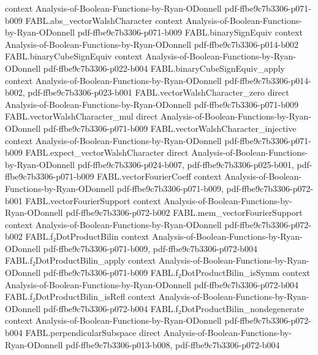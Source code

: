 \begin{theorem}
  {context}
  {Analysis-of-Boolean-Functions-by-Ryan-ODonnell}
  {pdf-ffbe9c7b3306-p071-b009}
\proofstep
  {FABL.abs_vectorWalshCharacter}
  {context}
  {Analysis-of-Boolean-Functions-by-Ryan-ODonnell}
  {pdf-ffbe9c7b3306-p071-b009}
\proofstep
  {FABL.binarySignEquiv}
  {context}
  {Analysis-of-Boolean-Functions-by-Ryan-ODonnell}
  {pdf-ffbe9c7b3306-p014-b002}
\proofstep
  {FABL.binaryCubeSignEquiv}
  {context}
  {Analysis-of-Boolean-Functions-by-Ryan-ODonnell}
  {pdf-ffbe9c7b3306-p022-b004}
\proofstep
  {FABL.binaryCubeSignEquiv_apply}
  {context}
  {Analysis-of-Boolean-Functions-by-Ryan-ODonnell}
  {pdf-ffbe9c7b3306-p014-b002,
    pdf-ffbe9c7b3306-p023-b001}
\proofstep
  {FABL.vectorWalshCharacter_zero}
  {direct}
  {Analysis-of-Boolean-Functions-by-Ryan-ODonnell}
  {pdf-ffbe9c7b3306-p071-b009}
\proofstep
  {FABL.vectorWalshCharacter_mul}
  {direct}
  {Analysis-of-Boolean-Functions-by-Ryan-ODonnell}
  {pdf-ffbe9c7b3306-p071-b009}
\proofstep
  {FABL.vectorWalshCharacter_injective}
  {context}
  {Analysis-of-Boolean-Functions-by-Ryan-ODonnell}
  {pdf-ffbe9c7b3306-p071-b009}
\proofstep
  {FABL.expect_vectorWalshCharacter}
  {direct}
  {Analysis-of-Boolean-Functions-by-Ryan-ODonnell}
  {pdf-ffbe9c7b3306-p024-b007,
    pdf-ffbe9c7b3306-p025-b001,
    pdf-ffbe9c7b3306-p071-b009}
\proofstep
  {FABL.vectorFourierCoeff}
  {context}
  {Analysis-of-Boolean-Functions-by-Ryan-ODonnell}
  {pdf-ffbe9c7b3306-p071-b009,
    pdf-ffbe9c7b3306-p072-b001}
\proofstep
  {FABL.vectorFourierSupport}
  {context}
  {Analysis-of-Boolean-Functions-by-Ryan-ODonnell}
  {pdf-ffbe9c7b3306-p072-b002}
\proofstep
  {FABL.mem_vectorFourierSupport}
  {context}
  {Analysis-of-Boolean-Functions-by-Ryan-ODonnell}
  {pdf-ffbe9c7b3306-p072-b002}
\proofstep
  {FABL.f₂DotProductBilin}
  {context}
  {Analysis-of-Boolean-Functions-by-Ryan-ODonnell}
  {pdf-ffbe9c7b3306-p071-b009,
    pdf-ffbe9c7b3306-p072-b004}
\proofstep
  {FABL.f₂DotProductBilin_apply}
  {context}
  {Analysis-of-Boolean-Functions-by-Ryan-ODonnell}
  {pdf-ffbe9c7b3306-p071-b009}
\proofstep
  {FABL.f₂DotProductBilin_isSymm}
  {context}
  {Analysis-of-Boolean-Functions-by-Ryan-ODonnell}
  {pdf-ffbe9c7b3306-p072-b004}
\proofstep
  {FABL.f₂DotProductBilin_isRefl}
  {context}
  {Analysis-of-Boolean-Functions-by-Ryan-ODonnell}
  {pdf-ffbe9c7b3306-p072-b004}
\proofstep
  {FABL.f₂DotProductBilin_nondegenerate}
  {context}
  {Analysis-of-Boolean-Functions-by-Ryan-ODonnell}
  {pdf-ffbe9c7b3306-p072-b004}
\proofstep
  {FABL.perpendicularSubspace}
  {direct}
  {Analysis-of-Boolean-Functions-by-Ryan-ODonnell}
  {pdf-ffbe9c7b3306-p013-b008,
    pdf-ffbe9c7b3306-p072-b004}

\end{theorem}
